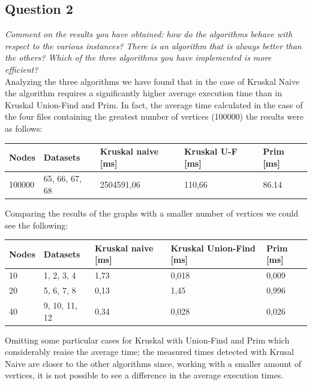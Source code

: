 \subsection{Question 2}
\textit{Comment on the results you have obtained: how do the algorithms behave with respect to the various instances? There is an algorithm that is always better than the others? Which of the three algorithms you have implemented is more efficient?} \\
\noindent
Analyzing the three algorithms we have found that in the case of Kruskal Naive the algorithm requires a significantly higher average execution time than in Kruskal Union-Find and Prim. In fact, the average time calculated in the case of the four files containing the greatest number of vertices (100000) the results were as follows:
\begin{table}[H]\centering
    \begin{tabular}{l|l|l|l|l}
        \textbf{Nodes} & \textbf{Datasets} & \textbf{Kruskal naive [ms]} & \textbf{Kruskal U-F [ms]} & \textbf{Prim [ms]} \\
    \hline
        100000 & 65, 66, 67, 68 & 2504591,06  & 110,66 & 86.14 
    \end{tabular}
\end{table}
\noindent
Comparing the results of the graphs with a smaller number of vertices we could see the following:
\begin{table}[H]\centering
    \begin{tabular}{l|l|l|l|l}
        \textbf{Nodes} & \textbf{Datasets} & \textbf{Kruskal naive [ms]} & \textbf{Kruskal Union-Find [ms]} & \textbf{Prim [ms]} \\
    \hline
        10 & 1, 2, 3, 4    & 1,73     & 0,018   & 0,009 \\
        20 & 5, 6, 7, 8    & 0,13     & 1,45    & 0,996 \\
        40 & 9, 10, 11, 12 & 0,34     & 0,028   & 0,026 \\
    \end{tabular}
\end{table}
\noindent
Omitting some particular cases for Kruskal with Union-Find and Prim which considerably reaise the average time; the measured times detected with Krusal Naive are closer to the other algorithms since, working with a smaller amount of vertices, it is not possible to see a difference in the average execution times.

